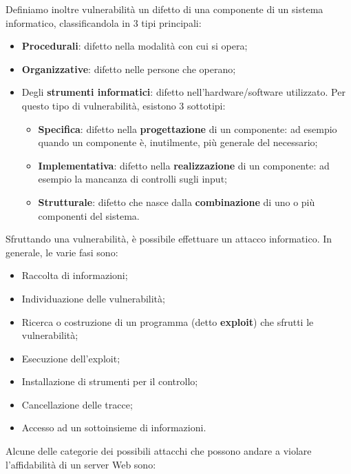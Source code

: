     Definiamo inoltre vulnerabilità un difetto di una componente di un sistema informatico,
    classificandola in 3 tipi principali:

    \begin{itemize}
        \item \textbf{Procedurali}: difetto nella modalità con cui si opera;
        \item \textbf{Organizzative}: difetto nelle persone che operano;
        \item Degli \textbf{strumenti informatici}: difetto nell’hardware/software utilizzato. Per questo tipo
        di vulnerabilità, esistono 3 sottotipi: \begin{itemize}
            \item \textbf{Specifica}: difetto nella \textbf{progettazione} di un componente: ad esempio quando un
            componente è, inutilmente, più generale del necessario;
            \item \textbf{Implementativa}: difetto nella \textbf{realizzazione} di un componente: ad esempio la
            mancanza di controlli sugli input;
            \item \textbf{Strutturale}: difetto che nasce dalla \textbf{combinazione} di uno o più componenti del
            sistema.
        \end{itemize}
    \end{itemize}

    Sfruttando una vulnerabilità, è possibile effettuare un attacco informatico. In generale, le varie
    fasi sono:

    \begin{itemize}
        \item Raccolta di informazioni;
        \item Individuazione delle vulnerabilità;
        \item Ricerca o costruzione di un programma (detto \textbf{exploit}) che sfrutti le vulnerabilità;
        \item Esecuzione dell’exploit;
        \item Installazione di strumenti per il controllo;
        \item Cancellazione delle tracce;
        \item Accesso ad un sottoinsieme di informazioni.
    \end{itemize}

    Alcune delle categorie dei possibili attacchi che possono andare a violare l’affidabilità di un
    server Web sono:

